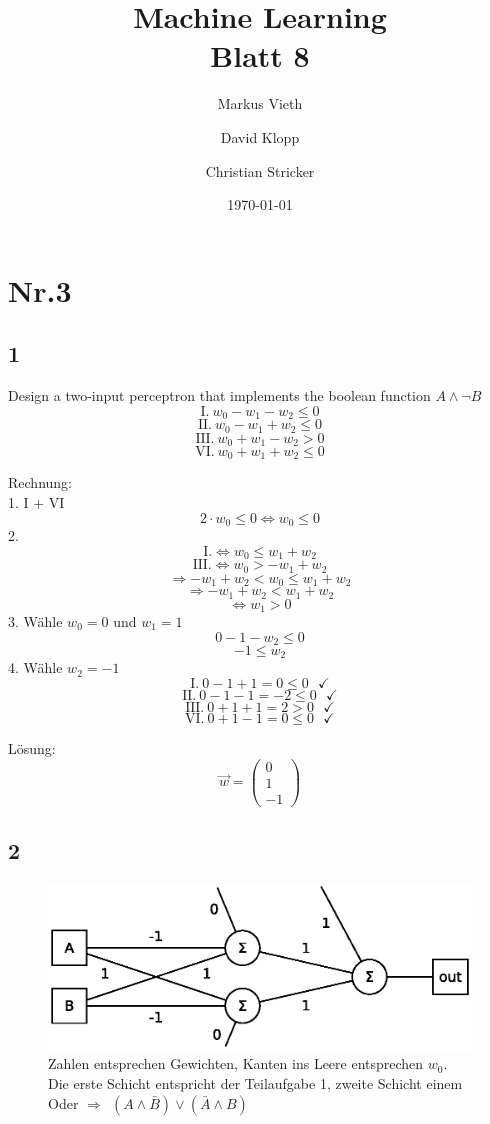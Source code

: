 \documentclass[a4paper,11pt,twoside]{scrartcl}
\title{Machine Learning\\ Blatt 8}
\author{Markus Vieth\and David Klopp\and Christian Stricker}
\date{\today}
\begin{document}
\newcommand{\cor}[1]{\textcolor{red}{\textit{#1}}}
\maketitle
\cleardoublepage
\pagestyle{myheadings}

\newpage

\section*{Nr.3}
\subsection*{1}
Design a two-input perceptron that implements the boolean function $A \land \neg B$
\[\text{I.}~w_0 - w_1 - w_2 \leq 0 \]
\[\text{II.}~w_0 - w_1 + w_2 \leq 0 \]
\[\text{III.}~w_0 + w_1 - w_2 > 0 \]
\[\text{VI.}~w_0 + w_1 + w_2 \leq 0 \]

Rechnung:\\
1. I + VI
\[2 \cdot w_0 \leq 0 \Leftrightarrow w_0 \leq 0 \]
2.
\[\text{I.} \Leftrightarrow w_0 \leq w_1 + w_2\]
\[\text{III.} \Leftrightarrow w_0 > -w_1 + w_2\]
\[\Rightarrow -w_1 + w_2 <  w_0 \leq w_1 + w_2\]
\[\Rightarrow -w_1 + w_2 < w_1 + w_2\]
\[ \Leftrightarrow w_1 > 0\]
3. Wähle $w_0 = 0$ und $w_1 = 1$
\[ 0 -1 -w_2 \leq 0\]
\[ -1 \leq w_2\]
4. Wähle $w_2 = -1$
\[\text{I.}~0 - 1 +1 = 0 \leq 0~~~\checkmark \]
\[\text{II.}~0 - 1 - 1 = -2 \leq 0~~~\checkmark \]
\[\text{III.}~0 + 1 +1 = 2 > 0~~~\checkmark \]
\[\text{VI.}~0 + 1 -1 = 0 \leq 0~~~\checkmark \]

Lösung:
\[
\overset{\rightarrow}{w} = \begin{pmatrix}
           0 \\
           1 \\
           -1
         \end{pmatrix}
\] 
\subsection*{2}
\begin{figure}[H]
\centering
\includegraphics{2Layer}
\caption{Zahlen entsprechen Gewichten, Kanten ins Leere entsprechen $w_0$. Die erste Schicht entspricht der Teilaufgabe 1, zweite Schicht einem Oder $\Rightarrow~~ (A\land\bar{B})\lor(\bar{A}\land B)$}
\label{fig:2Layer}
\end{figure}
\end{document}

